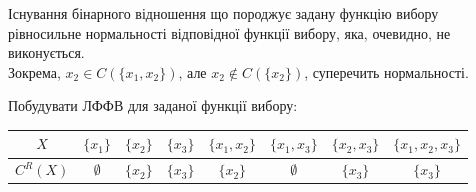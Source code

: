 \begin{solution}
    
    Існування бінарного відношення що породжує задану функцію вибору рівносильне нормальності відповідної функції вибору, яка, очевидно, не виконується. \\
        
    Зокрема, $x_2 \in C(\{x_1, x_2\})$, але $x_2 \notin C(\{x_2\})$, суперечить нормальності.
\end{solution}

\newpage

\begin{problem}
    Побудувати ЛФФВ для заданої функції вибору: 
    
    \begin{table}[H]
        \centering
        \begin{tabular}{|c|c|c|c|c|c|c|c|}
            \hline
            $X$ & $\{x_1\}$ & $\{x_2\}$ & $\{x_3\}$ & $\{x_1, x_2\}$ & $\{x_1, x_3\}$ & $\{x_2, x_3\}$ & $\{x_1, x_2, x_3\}$ \\ \hline
            $C^R(X)$ & $\emptyset$ & $\{x_2\}$ & $\{x_3\}$ & $\{x_2\}$ & $\emptyset$ & $\{x_3\}$ & $\{x_3\}$ \\ \hline
        \end{tabular}
    \end{table}
\end{problem}


